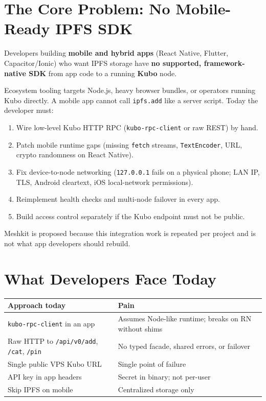 \documentclass[11pt,a4paper,openany]{report}
\begin{document}
\section{The Core Problem: No Mobile-Ready IPFS SDK}

Developers building \textbf{mobile and hybrid apps} (React Native, Flutter, Capacitor/Ionic) who want IPFS storage have \textbf{no supported, framework-native SDK} from app code to a running \textbf{Kubo} node.

Ecosystem tooling targets Node.js, heavy browser bundles, or operators running Kubo directly. A mobile app cannot call \texttt{ipfs.add} like a server script. Today the developer must:

\begin{enumerate}[leftmargin=*]
  \item Wire low-level Kubo HTTP RPC (\texttt{kubo-rpc-client} or raw REST) by hand.
  \item Patch mobile runtime gaps (missing \texttt{fetch} streams, \texttt{TextEncoder}, URL, crypto randomness on React Native).
  \item Fix device-to-node networking (\texttt{127.0.0.1} fails on a physical phone; LAN IP, TLS, Android cleartext, iOS local-network permissions).
  \item Reimplement health checks and multi-node failover in every app.
  \item Build access control separately if the Kubo endpoint must not be public.
\end{enumerate}

Meshkit is proposed because this integration work is repeated per project and is not what app developers should rebuild.

\section{What Developers Face Today}

\begin{center}
\small
\begin{tabular}{@{}lp{8.8cm}@{}}
\toprule
\textbf{Approach today} & \textbf{Pain} \\
\midrule
\texttt{kubo-rpc-client} in an app & Assumes Node-like runtime; breaks on RN without shims \\
Raw HTTP to \texttt{/api/v0/add}, \texttt{/cat}, \texttt{/pin} & No typed facade, shared errors, or failover \\
Single public VPS Kubo URL & Single point of failure \\
API key in app headers & Secret in binary; not per-user \\
Skip IPFS on mobile & Centralized storage only \\
\bottomrule
\end{tabular}
\end{center}
\end{document}
